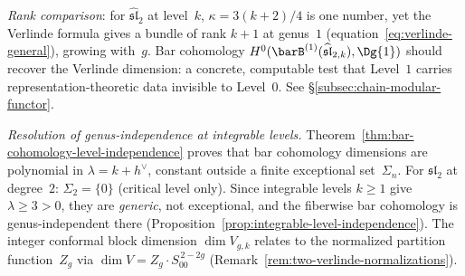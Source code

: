 \begin{remark}
\smallskip\noindent
\emph{Rank comparison}: for $\widehat{\mathfrak{sl}}_2$ at level~$k$,
$\kappa = 3(k{+}2)/4$ is one number, yet the Verlinde formula
gives a bundle of rank $k{+}1$ at genus~$1$
(equation~\eqref{eq:verlinde-general}), growing with~$g$.
Bar cohomology $H^0(\barB^{(1)}(\widehat{\mathfrak{sl}}_{2,k}),
\Dg{1})$ should recover the Verlinde dimension: a concrete,
computable test that Level~$1$ carries representation-theoretic
data invisible to Level~$0$. See
\S\ref{subsec:chain-modular-functor}.

\smallskip\noindent
\emph{Resolution of genus-independence at integrable levels.}
Theorem~\ref{thm:bar-cohomology-level-independence} proves that
bar cohomology dimensions are polynomial in $\lambda = k + h^\vee$,
constant outside a finite exceptional set~$\Sigma_n$. For
$\mathfrak{sl}_2$ at degree~$2$: $\Sigma_2 = \{0\}$ (critical level
only). Since integrable levels $k \ge 1$ give $\lambda \ge 3 > 0$,
they are \emph{generic}, not exceptional, and the fiberwise bar
cohomology is genus-independent there
(Proposition~\ref{prop:integrable-level-independence}). The
integer conformal block dimension $\dim V_{g,k}$ relates to the
normalized partition function~$Z_g$ via $\dim V = Z_g \cdot
S_{00}^{\,2-2g}$ (Remark~\ref{rem:two-verlinde-normalizations}).
\end{remark}


